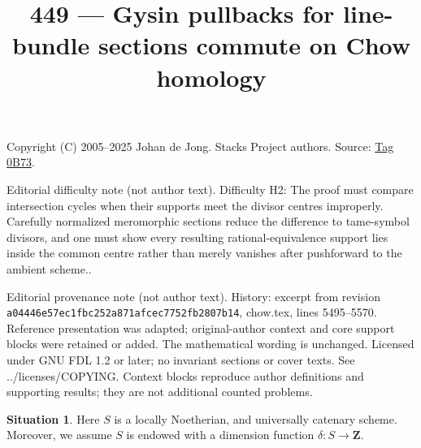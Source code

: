 \documentclass{amsart}
\theoremstyle{plain}
\theoremstyle{definition}
\newtheorem{situation}[subsection]{Situation}
\theoremstyle{remark}
\numberwithin{equation}{subsection}
\begin{document}
\title[Stacks Project, Tag 0B73]{449 --- Gysin pullbacks for line-bundle sections commute on Chow homology}
\maketitle
\noindent Copyright (C) 2005--2025 Johan de Jong. Stacks Project authors. Source: \href{https://stacks.math.columbia.edu/tag/0B73}{Tag 0B73}.

\noindent Editorial difficulty note (not author text). Difficulty H2: The proof must compare intersection cycles when their supports meet the divisor centres improperly. Carefully normalized meromorphic sections reduce the difference to tame-symbol divisors, and one must show every resulting rational-equivalence support lies inside the common centre rather than merely vanishes after pushforward to the ambient scheme..

\noindent Editorial provenance note (not author text). History: excerpt from revision \texttt{a0444\allowbreak 6e57e\allowbreak c1fbc\allowbreak 252a8\allowbreak 71afc\allowbreak ec775\allowbreak 2fb28\allowbreak 07b14}, chow.tex, lines 5495--5570. Reference presentation was adapted; original-author context and core support blocks were retained or added. The mathematical wording is unchanged. Licensed under GNU FDL 1.2 or later; no invariant sections or cover texts. See ../licenses/COPYING. Context blocks reproduce author definitions and supporting results; they are not additional counted problems.

\begin{situation}
\label{situation-setup}
Here $S$ is a locally Noetherian, and universally catenary scheme.
Moreover, we assume $S$ is endowed with a dimension function
$\delta : S \longrightarrow \mathbf{Z}$.
\end{situation}
\end{document}
